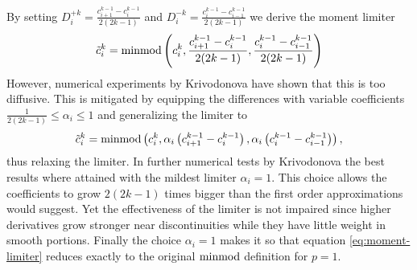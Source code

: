 By setting $D_{i}^{+k} = \frac{c_{i + 1}^{k - 1} - c_{i}^{k - 1}}{2(2k - 1)}$ and $D_{i}^{-k} = \frac{c_{i}^{k - 1} - c_{i - 1}^{k - 1}}{2(2k - 1)}$ we derive the moment limiter
\begin{equation*}
  \tilde{c}_{i}^{k} = \operatorname{minmod}\left( c_{i}^{k}, \frac{c_{i + 1}^{k - 1} - c_{i}^{k - 1}}{2(2k - 1)}, \frac{c_{i}^{k - 1} - c_{i - 1}^{k - 1}}{2(2k - 1)} \right)
\end{equation*}
However, numerical experiments by Krivodonova have shown that this is too diffusive.
This is mitigated by equipping the differences with variable coefficients $\frac{1}{2(2k - 1)} \le \alpha_{i} \le 1$ and generalizing the limiter to
\begin{equation}
  \tilde{c}_{i}^{k} = \operatorname{minmod}\left( c_{i}^{k}, \alpha_{i} \left( c_{i + 1}^{k - 1} - c_{i}^{k - 1} \right), \alpha_{i} \left( c_{i}^{k - 1} - c_{i - 1}^{k - 1} \right) \right), \label{eq:moment-limiter}
\end{equation}
thus relaxing the limiter.
In further numerical tests by Krivodonova the best results where attained with the mildest limiter $\alpha_{i} = 1$.
This choice allows the coefficients to grow $2(2k - 1)$ times bigger than the first order approximations would suggest.
Yet the effectiveness of the limiter is not impaired since higher derivatives grow stronger near discontinuities while they have little weight in smooth portions.
Finally the choice $\alpha_{i} = 1$ makes it so that equation \eqref{eq:moment-limiter} reduces exactly to the original $\operatorname{minmod}$ definition for $p = 1$.

